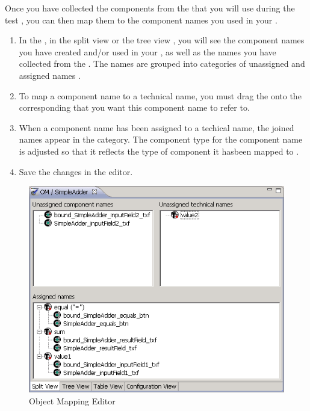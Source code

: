 Once you have collected the components from the \gdaut{} that you will use during the test , you can then map them to the component names you used in your \gdcases{}. 


\begin{enumerate}
\item In the \gdomeditor{}, in the split view or the tree view , you will see the component names you have created  and/or used in your \gdcases{}, as well as the names you have collected from the \gdaut{}. The names are grouped into categories of unassigned and assigned names . 
\item To map a component name to a technical name, you must drag the  onto the corresponding  that you want this component name to refer to. 

\item When a component name has been assigned to a techical name, the joined names appear in the  category. The component type for the component name is adjusted so that it reflects the type of component it hasbeen mapped to . 

\item Save the changes in the editor. 
\end{enumerate}

\begin{figure}
\begin{center}
\includegraphics{Tasks/Objectmapping/PS/objectmappinghowto}
\caption{Object Mapping Editor}
\label{objectmappingeditor}
\end{center}
\end{figure}

